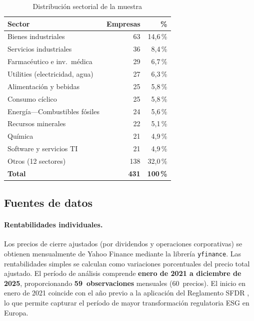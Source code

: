 \documentclass[12pt, a4paper]{article}
\begin{document}
\begin{table}[H]
  \centering
  \caption{Distribuci\'on sectorial de la muestra}
  \label{tab:sectores_dist}
  \begin{tabular}{lrr}
    \toprule
    Sector & Empresas & \% \\
    \midrule
    Bienes industriales           & 63  & 14{,}6\,\% \\
    Servicios industriales        & 36  & 8{,}4\,\% \\
    Farmac\'eutico e inv.\ m\'edica & 29 & 6{,}7\,\% \\
    Utilities (electricidad, agua) & 27 & 6{,}3\,\% \\
    Alimentaci\'on y bebidas      & 25  & 5{,}8\,\% \\
    Consumo c\'iclico             & 25  & 5{,}8\,\% \\
    Energ\'ia---Combustibles f\'osiles & 24 & 5{,}6\,\% \\
    Recursos minerales            & 22  & 5{,}1\,\% \\
    Qu\'imica                     & 21  & 4{,}9\,\% \\
    Software y servicios TI       & 21  & 4{,}9\,\% \\
    Otros (12 sectores)           & 138 & 32{,}0\,\% \\
    \midrule
    \textbf{Total}                & \textbf{431} & \textbf{100\,\%} \\
    \bottomrule
  \end{tabular}
\end{table}

\subsection{Fuentes de datos}
\label{subsec:fuentes}

\paragraph{Rentabilidades individuales.} Los precios de cierre ajustados (por dividendos
y operaciones corporativas) se obtienen mensualmente de Yahoo Finance mediante la
librer\'ia \texttt{yfinance}. Las rentabilidades simples se calculan como variaciones
porcentuales del precio total ajustado. El per\'iodo de an\'alisis comprende
\textbf{enero de 2021 a diciembre de 2025}, proporcionando \textbf{59~observaciones}
mensuales (60~precios). El inicio en enero de 2021 coincide con el a\~no previo a
la aplicaci\'on del Reglamento SFDR \parencite{sfdr2019}, lo que permite capturar
el per\'iodo de mayor transformaci\'on regulatoria ESG en Europa.
\end{document}
